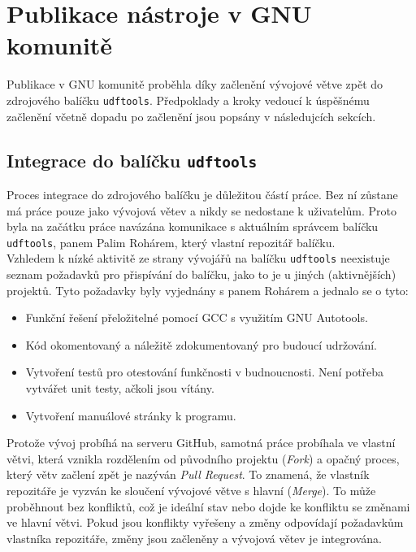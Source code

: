 \chapter{Publikace nástroje v GNU komunitě}
\label{ch:publikace}
Publikace v GNU komunitě proběhla díky začlenění vývojové větve zpět do zdrojového balíčku \texttt{udftools}. Předpoklady a kroky vedoucí k úspěšnému začlenění včetně dopadu po začlenění jsou popsány v následujcích sekcích.

\section{Integrace do balíčku \texttt{udftools}}
\label{sec:integrace}
Proces integrace do zdrojového balíčku je důležitou částí práce. Bez ní zůstane má práce pouze jako vývojová větev a nikdy se nedostane k uživatelům. Proto byla na začátku práce navázána komunikace s aktuálním správcem balíčku \texttt{udftools}, panem Palim Rohárem, který vlastní repozitář balíčku.\\
Vzhledem k nízké aktivitě ze strany vývojářů na balíčku \texttt{udftools} neexistuje seznam požadavků pro přispívání do balíčku, jako to je u jiných (aktivnějších) projektů. Tyto požadavky byly vyjednány s panem Rohárem a jednalo se o tyto:
\begin{itemize}
    \item Funkční řešení přeložitelné pomocí GCC s využitím GNU Autotools. 
    \item Kód okomentovaný a náležitě zdokumentovaný pro budoucí udržování.
    \item Vytvoření testů pro otestování funkčnosti v budnoucnosti. Není potřeba vytvářet unit testy, ačkoli jsou vítány.
    \item Vytvoření manuálové stránky k programu.
\end{itemize}
Protože vývoj probíhá na serveru GitHub, samotná práce probíhala ve vlastní větvi, která vznikla rozdělením od původního projektu (\textit{Fork}) a opačný proces, který větv začlení zpět je nazýván \textit{Pull Request}. To znamená, že vlastník repozitáře je vyzván ke sloučení vývojové větve s hlavní (\textit{Merge}). To může proběhnout bez konfliktů, což je ideální stav nebo dojde ke konfliktu se změnami ve hlavní větvi. Pokud jsou konflikty vyřešeny a změny odpovídají požadavkům vlastníka repozitáře, změny jsou začleněny a vývojová větev je integrována. 

